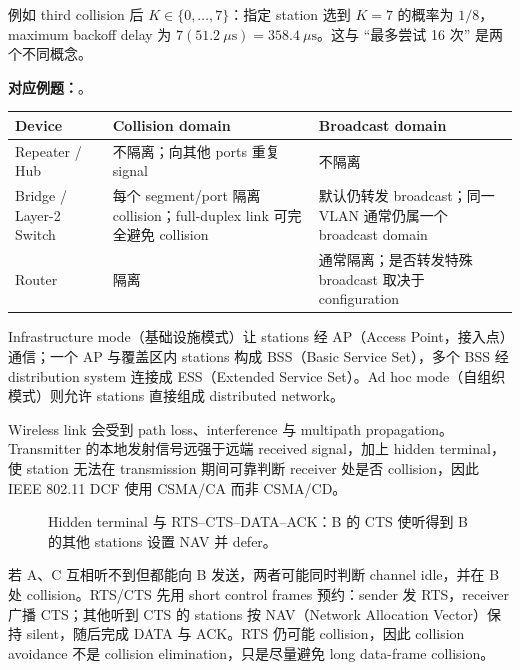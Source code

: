 例如 third collision 后 $K\in\{0,\ldots,7\}$：指定 station 选到 $K=7$ 的概率为 $1/8$，maximum backoff delay 为 $7(51.2\ \mu\mathrm{s})=358.4\ \mu\mathrm{s}$。这与 ``最多尝试 16 次'' 是两个不同概念。

\textbf{对应例题：}。

\begin{center}
\small
\begin{tabularx}{\textwidth}{@{}>{\raggedright\arraybackslash}p{3.0cm}XX@{}}
  \toprule
  Device & Collision domain & Broadcast domain \\
  \midrule
  Repeater / Hub & 不隔离；向其他 ports 重复 signal & 不隔离 \\
  Bridge / Layer-2 Switch & 每个 segment/port 隔离 collision；full-duplex link 可完全避免 collision & 默认仍转发 broadcast；同一 VLAN 通常仍属一个 broadcast domain \\
  Router & 隔离 & 通常隔离；是否转发特殊 broadcast 取决于 configuration \\
  \bottomrule
\end{tabularx}
\end{center}


Infrastructure mode（基础设施模式）让 stations 经 AP（Access Point，接入点）通信；一个 AP 与覆盖区内 stations 构成 BSS（Basic Service Set），多个 BSS 经 distribution system 连接成 ESS（Extended Service Set）。Ad hoc mode（自组织模式）则允许 stations 直接组成 distributed network。

Wireless link 会受到 path loss、interference 与 multipath propagation。Transmitter 的本地发射信号远强于远端 received signal，加上 hidden terminal，使 station 无法在 transmission 期间可靠判断 receiver 处是否 collision，因此 IEEE 802.11 DCF 使用 CSMA/CA 而非 CSMA/CD。

\begin{figure}[htbp]
  \centering
  \resizebox{0.96\textwidth}{!}{}
  \caption{Hidden terminal 与 RTS--CTS--DATA--ACK：B 的 CTS 使听得到 B 的其他 stations 设置 NAV 并 defer。}
  \label{fig:sc2008-l04-hidden-terminal}
\end{figure}

若 A、C 互相听不到但都能向 B 发送，两者可能同时判断 channel idle，并在 B 处 collision。RTS/CTS 先用 short control frames 预约：sender 发 RTS，receiver 广播 CTS；其他听到 CTS 的 stations 按 NAV（Network Allocation Vector）保持 silent，随后完成 DATA 与 ACK。RTS 仍可能 collision，因此 collision avoidance 不是 collision elimination，只是尽量避免 long data-frame collision。

